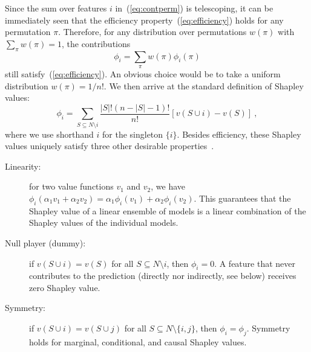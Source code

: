 \documentclass{article}
\newcommand{\vX}{\mathbf{X}}
\newcommand{\vx}{\mathbf{x}}
\newcommand{\expectation}{\mathbb{E}}
\newcommand{\contribution}{{\phi}}
\newcommand{\val}{{v}}
\newcommand{\perm}{\pi}
\newcommand{\operator}{\mathit{op}}
\newcommand{\svop}[1]{\operator(\vx_{#1})}
\newcommand{\allfeatures}{{N}}
\begin{document}
Since the sum over features $i$ in~(\ref{eq:contperm}) is telescoping, it can be immediately seen that the efficiency property~(\ref{eq:efficiency}) holds for any permutation $\perm$.
Therefore, for any distribution over permutations $w(\perm)$ with $\sum_{\perm} w(\perm) = 1$, the contributions
\begin{equation}
\contribution_i = \sum_{\perm} w(\perm) \contribution_i(\perm)
\label{eq:shapperm}
\end{equation}
still satisfy~(\ref{eq:efficiency}). An obvious choice would be to take a uniform distribution $w(\perm) = 1/n!$. We then arrive at the standard definition of Shapley values:
\[
\contribution_i = \sum_{S \subseteq \allfeatures\setminus i} \frac{|S|! (n-|S|-1)!}{n!} \left[\val(S \cup i) - \val(S) \right] \: ,
\]
where we use shorthand $i$ for the singleton $\{i\}$. Besides efficiency, these Shapley values uniquely satisfy three other desirable properties~\cite{shapley1953value}.
\begin{description}
	\item[Linearity:] for two value functions $\val_1$ and $\val_2$, we have $\contribution_i(\alpha_1 \val_1 + \alpha_2 \val_2) = \alpha_1 \contribution_i(\val_1) + \alpha_2 \contribution_i(\val_2)$. This guarantees that the Shapley value of a linear ensemble of models is a linear combination of the Shapley values of the individual models.
	\item[Null player (dummy):] if $\val(S \cup i) = \val(S)$ for all $S \subseteq \allfeatures \setminus i$, then $\contribution_i = 0$. A feature that never contributes to the prediction (directly nor indirectly, see below) receives zero Shapley value.
	\item[Symmetry:] if $\val(S \cup i) = \val(S \cup j)$ for all  $S \subseteq \allfeatures \setminus \{i,j\}$, then $\contribution_i = \contribution_j$. Symmetry holds for marginal, conditional, and causal Shapley values.
\end{description}
\end{document}

